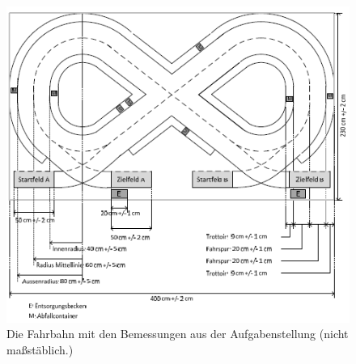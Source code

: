 \begin{figure}[ht]
	\centering									
	\includegraphics{Images/Fahrbahn.png}
	\caption{Die Fahrbahn mit den Bemessungen aus der Aufgabenstellung (nicht maßstäblich.)}
	\label{fig1}
\end{figure}